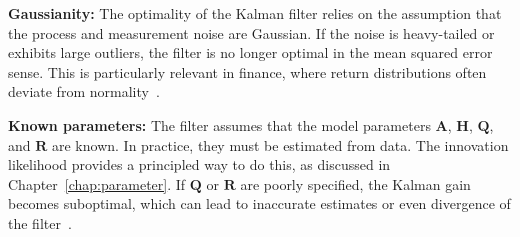 \textbf{Gaussianity:}
The optimality of the Kalman filter relies on the assumption that the process and measurement noise are Gaussian. If the noise is heavy-tailed or exhibits large outliers, the filter is no longer optimal in the mean squared error sense. This is particularly relevant in finance, where return distributions often deviate from normality~\cite[Ch.~2]{palomar:portfolio_optimization}. 

\textbf{Known parameters:}
The filter assumes that the model parameters $\mathbf{A}$, $\mathbf{H}$, $\mathbf{Q}$, and $\mathbf{R}$ are known. In practice, they must be estimated from data. The innovation likelihood provides a principled way to do this, as discussed in Chapter~\ref{chap:parameter}. If $\mathbf{Q}$ or $\mathbf{R}$ are poorly specified, the Kalman gain becomes suboptimal, which can lead to inaccurate estimates or even divergence of the filter~\cite[Ch.~4]{sarkka:bayesian_filtering}.





